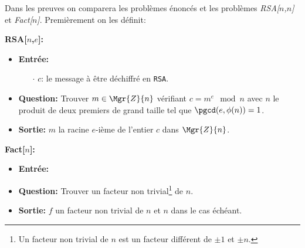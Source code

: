 Dans les preuves on comparera les problèmes énoncés et les problèmes \textit{RSA[$n$,$n$]} et \textit{Fact[$n$]}. Premièrement on les définit:


\begin{problem} \textbf{RSA[$n$,$e$]:}%
\begin{rm}
		\begin{itemize}	
		\renewcommand{\labelitemi}{}
		\item\textbf{Entrée:} 
			\begin{itemize}
				\item[$\cdot$] $c$: le message à être déchiffré en \verb!RSA!.
			\end{itemize}
		\item\textbf{Question:} Trouver $m\in\Mgr{Z}{n}$ vérifiant $c = m^e\mod{n}$ avec $n$ le produit 
		de deux premiers de grand taille tel que $\pgcd(e,\phi(n))= 1$.    
		\item\textbf{Sortie:}
			$m$ la racine $e$-ième de l'entier $c$ dans $\Mgr{Z}{n}$.
		\end{itemize}
	\end{rm}
\end{problem}


\begin{problem} \textbf{Fact[$n$]:}%
	\begin{rm}
		\begin{itemize}	
		\renewcommand{\labelitemi}{}
		\item\textbf{Entrée:} 

		\item\textbf{Question:} Trouver un facteur non trivial\footnote{Un facteur non trivial de $n$ est un facteur différent de $\pm1$ et $\pm n$.} de $n$.%

		\item\textbf{Sortie:}
			$f$ un facteur non trivial de $n$ et $n$ dans le cas échéant.
		\end{itemize}
	\end{rm}	
\end{problem}

